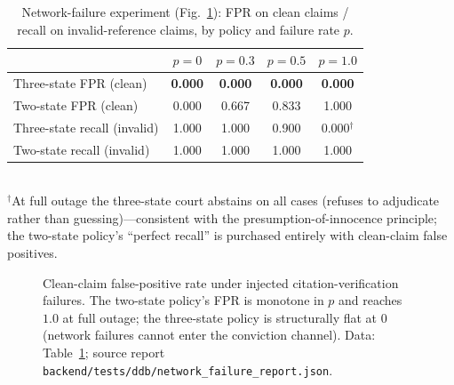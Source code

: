 \documentclass[11pt]{article}
\begin{document}
\begin{table}[t]
\centering\small
\caption{Network-failure experiment (Fig.~\ref{fig:net}): FPR on clean
claims / recall on invalid-reference claims, by policy and failure rate
$p$.}
\label{tab:network}
\begin{tabular}{@{}lcccc@{}}
\toprule
& $p=0$ & $p=0.3$ & $p=0.5$ & $p=1.0$ \\
\midrule
Three-state FPR (clean) & \textbf{0.000} & \textbf{0.000} & \textbf{0.000} & \textbf{0.000} \\
Two-state FPR (clean) & 0.000 & 0.667 & 0.833 & 1.000 \\
Three-state recall (invalid) & 1.000 & 1.000 & 0.900 & 0.000$^{\dagger}$ \\
Two-state recall (invalid) & 1.000 & 1.000 & 1.000 & 1.000 \\
\bottomrule
\end{tabular}
\\[2pt]
{\footnotesize $^{\dagger}$At full outage the three-state court abstains on
all cases (refuses to adjudicate rather than guessing)—consistent with the
presumption-of-innocence principle; the two-state policy's ``perfect
recall'' is purchased entirely with clean-claim false positives.}
\end{table}

\begin{figure}[t]
\centering
{}
\caption{Clean-claim false-positive rate under injected citation-verification
failures. The two-state policy's FPR is monotone in $p$ and reaches $1.0$ at
full outage; the three-state policy is structurally flat at $0$ (network
failures cannot enter the conviction channel). Data: Table~\ref{tab:network};
source report \texttt{backend/tests/ddb/network\_failure\_report.json}.}
\label{fig:net}
\end{figure}
\end{document}
